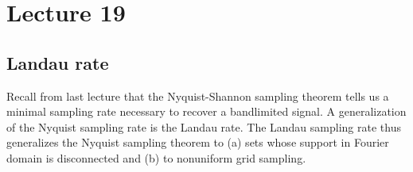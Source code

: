 \chapter{Lecture 19}
\section{Landau rate}
Recall from last lecture that the Nyquist-Shannon sampling theorem tells us a minimal sampling rate necessary to recover a bandlimited signal. A generalization of the Nyquist sampling rate is the Landau rate. 
The Landau sampling rate thus generalizes the Nyquist sampling theorem to (a) sets whose support in Fourier domain is disconnected and (b) to nonuniform grid sampling.


